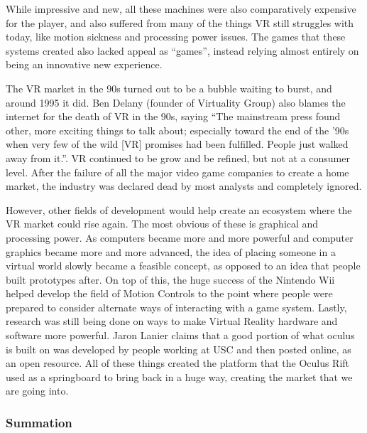 \documentclass[a4paper,10pt,twoside]{article}
\begin{document}
	While impressive and new, all these machines were also comparatively expensive for the player, and also suffered from many of the things VR still struggles with today, like motion sickness and processing power issues.  The games that these systems created also lacked appeal as “games”, instead relying almost entirely on being an innovative new experience.  
	
	The VR market in the 90s turned out to be a bubble waiting to burst, and around 1995 it did.  Ben Delany (founder of Virtuality Group) also blames the internet for the death of VR in the 90s, saying “The mainstream press found other, more exciting things to talk about; especially toward the end of the ’90s when very few of the wild [VR] promises had been fulfilled. People just walked away from it.”.
	VR continued to be grow and be refined, but not at a consumer level.  After the failure of all the major video game companies to create a home market, the industry was declared dead by most analysts and completely ignored.  
	
	However, other fields of development would help create an ecosystem where the VR market could rise again.  The most obvious of these is graphical and processing power.  As computers became more and more powerful and computer graphics became more and more advanced, the idea of placing someone in a virtual world slowly became a feasible concept, as opposed to an idea that people built prototypes after.  On top of this, the huge success of the Nintendo Wii helped develop the field of Motion Controls to the point where people were prepared to consider alternate ways of interacting with a game system.  Lastly, research was still being done on ways to make Virtual Reality hardware and software more powerful.  Jaron Lanier claims that a good portion of what oculus is built on was developed by people working at USC and then posted online, as an open resource.  All of these things created the platform that the Oculus Rift used as a springboard to bring back in a huge way, creating the market that we are going into.
	\subsubsection{Summation}
	
\end{document}
